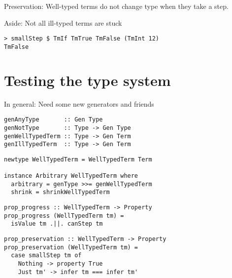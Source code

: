 \documentclass{beamer}
\begin{document}
\begin{frame}[c]
  \begin{center}
    Preservation: Well-typed terms do not change type when they take a step.
  \end{center}
\end{frame}

\begin{frame}[fragile,c]
  \begin{center}
    Aside: Not all ill-typed terms are stuck
  \end{center}
  \begin{verbatim}
> smallStep $ TmIf TmTrue TmFalse (TmInt 12)
TmFalse
  \end{verbatim}
\end{frame}

\section{Testing the type system}

\begin{frame}[fragile]
  \begin{center}
    In general: Need some new generators and friends
  \end{center}
  \begin{verbatim}
genAnyType       :: Gen Type
genNotType       :: Type -> Gen Type
genWellTypedTerm :: Type -> Gen Term
genIllTypedTerm  :: Type -> Gen Term
  \end{verbatim}
\end{frame}

\begin{frame}[fragile]
  \begin{verbatim}
newtype WellTypedTerm = WellTypedTerm Term

instance Arbitrary WellTypedTerm where
  arbitrary = genType >>= genWellTypedTerm
  shrink = shrinkWellTypedTerm
  \end{verbatim}
\end{frame}

\begin{frame}[fragile]
  \begin{verbatim}
prop_progress :: WellTypedTerm -> Property
prop_progress (WellTypedTerm tm) =
  isValue tm .||. canStep tm
  \end{verbatim}
\end{frame} 

\begin{frame}[fragile]
  \begin{verbatim}
prop_preservation :: WellTypedTerm -> Property
prop_preservation (WellTypedTerm tm) =
  case smallStep tm of
    Nothing -> property True
    Just tm' -> infer tm === infer tm'
  \end{verbatim}
\end{frame} 
\end{document}
